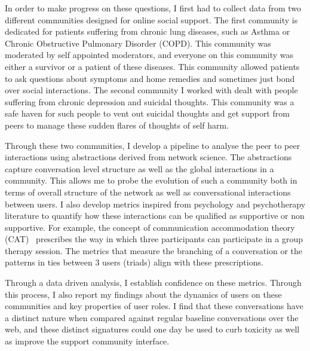 In order to make progress on these questions, I first had to collect data from two different communities designed for online social support. The first community is dedicated for patients suffering from chronic lung diseases, such as Asthma or Chronic Obstructive Pulmonary Disorder (COPD). This community was moderated by self appointed moderators, and everyone on this community was either a survivor or a patient of these diseases. This community allowed patients to ask questions about symptoms and home remedies and sometimes just bond over social interactions. The second community I worked with dealt with people suffering from chronic depression and suicidal thoughts. This community was a safe haven for such people to vent out suicidal thoughts and get support from peers to manage these sudden flares of thoughts of self harm. 

Through these two communities, I develop a pipeline to analyse the peer to peer interactions using abstractions derived from network science. The abstractions capture conversation level structure as well as the global interactions in a community. This allows me to probe the evolution of such a community both in terms of overall structure of the network as well as conversational interactions between users. 
I also develop metrics inspired from psychology and psychotherapy literature to quantify how these interactions can be qualified as supportive or non supportive. For example, the concept of communication accommodation theory (CAT)~\cite{coupland1988introduction} prescribes the way in which three participants can participate in a group therapy session. The metrics that measure the branching of a conversation or the patterns in ties between 3 users (triads) align with these prescriptions. 

Through a data driven analysis, I establish confidence on these metrics. Through this process, I also report my findings about the dynamics of users on these communities and key properties of user roles. I find that these conversations have a distinct nature when compared against regular baseline conversations over the web, and these distinct signatures could one day be used to curb toxicity as well as improve the support community interface.

